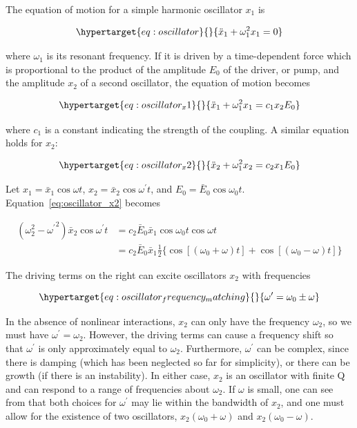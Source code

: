 \documentclass[
  notoc %
]{tufte-book}
\begin{document}
The equation of motion for a simple harmonic oscillator \(x_1\) is

\begin{equation}\protect\hypertarget{eq:oscillator}{}{
\ddot{x}_1 + \omega_1^2 x_1 = 0
}\label{eq:oscillator}\end{equation}

where \(\omega_1\) is its resonant frequency. If it is driven by a
time-dependent force which is proportional to the product of the
amplitude \(E_0\) of the driver, or pump, and the amplitude \(x_2\) of a
second oscillator, the equation of motion becomes

\begin{equation}\protect\hypertarget{eq:oscillator_x1}{}{
\ddot{x}_1 + \omega_1^2 x_1 = c_1x_2E_0
}\label{eq:oscillator_x1}\end{equation}

where \(c_1\) is a constant indicating the strength of the coupling. A
similar equation holds for \(x_2\):

\begin{equation}\protect\hypertarget{eq:oscillator_x2}{}{
\ddot{x}_2 + \omega_1^2 x_2 = c_2x_1E_0
}\label{eq:oscillator_x2}\end{equation}

Let \(x_1=\bar{x}_1 \cos\omega t\),
\(x_2=\bar{x}_2 \cos\omega^\prime t\), and
\(E_0=\bar{E}_0 \cos\omega_0 t\). Equation~\ref{eq:oscillator_x2}
becomes

\[
\begin{aligned}
(\omega_2^2 - {\omega^\prime}^2)\bar{x}_2\cos\omega^\prime t &= c_2\bar{E}_0\bar{x}_1\cos\omega_0 t\cos\omega t \\
&= c_2\bar{E}_0\bar{x}_1 \frac{1}{2}\{ \cos[(\omega_0 + \omega)t] + \cos[(\omega_0 - \omega)t]  \}
\end{aligned}
\]

The driving terms on the right can excite oscillators \(x_2\) with
frequencies

\begin{equation}\protect\hypertarget{eq:oscillator_frequency_matching}{}{
\omega^\prime = \omega_0\pm\omega
}\label{eq:oscillator_frequency_matching}\end{equation}

In the absence of nonlinear interactions, \(x_2\) can only have the
frequency \(\omega_2\), so we must have \(ω^\prime = \omega_2\).
However, the driving terms can cause a frequency shift so that
\(ω^\prime\) is only approximately equal to \(\omega_2\). Furthermore,
\(\omega^\prime\) can be complex, since there is damping (which has been
neglected so far for simplicity), or there can be growth (if there is an
instability). In either case, \(x_2\) is an oscillator with finite Q and
can respond to a range of frequencies about \(\omega_2\). If \(\omega\)
is small, one can see from that both choices for \(\omega^\prime\) may
lie within the bandwidth of \(x_2\), and one must allow for the
existence of two oscillators, \(x_2(\omega_0+\omega)\) and
\(x_2(\omega_0 - \omega)\).
\end{document}

